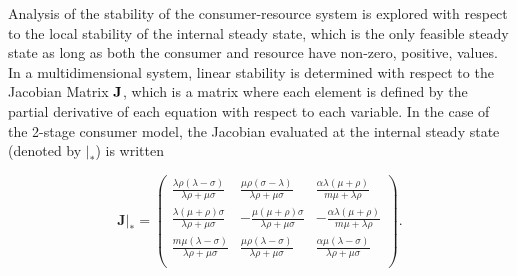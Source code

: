 \documentclass[11pt]{article}
\begin{document}
Analysis of the stability of the consumer-resource system is explored with respect to the local stability of the internal steady state, which is the only feasible steady state as long as both the consumer and resource have non-zero, positive, values.
In a multidimensional system, linear stability is determined with respect to the Jacobian Matrix $\bf J$, which is a matrix where each element is defined by the partial derivative of each equation with respect to each variable.
In the case of the 2-stage consumer model, the Jacobian evaluated at the internal steady state (denoted by $|_*$) is written

\begin{equation}
\mathbf{J}|_* =
\left(
\begin{array}{ccc}
 \frac{\lambda  \rho  (\lambda -\sigma )}{\lambda  \rho +\mu  \sigma } & \frac{\mu  \rho  (\sigma -\lambda )}{\lambda  \rho +\mu  \sigma } & \frac{\alpha  \lambda  (\mu +\rho )}{m \mu +\lambda  \rho } \\
 \frac{\lambda  (\mu +\rho ) \sigma }{\lambda  \rho +\mu  \sigma } & -\frac{\mu  (\mu +\rho ) \sigma }{\lambda  \rho +\mu  \sigma } & -\frac{\alpha  \lambda  (\mu +\rho )}{m \mu +\lambda  \rho } \\
 \frac{m \mu  (\lambda -\sigma )}{\lambda  \rho +\mu  \sigma } & \frac{\mu  \rho  (\lambda -\sigma )}{\lambda  \rho +\mu  \sigma } & \frac{\alpha  \mu  (\lambda -\sigma )}{\lambda  \rho +\mu  \sigma } \\
\end{array}
\right).
\end{equation}
\end{document}
